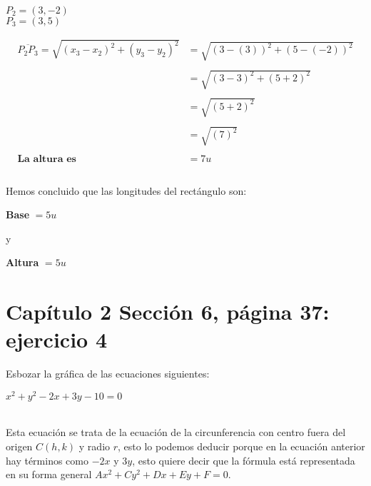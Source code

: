 \documentclass[12pt]{article}
\begin{document}
 $P_2 = (3,-2)$\\
 
 $P_3 = (3,5)$

\newpage

\begin{equation}
    \begin{split}
       \overline{P_2P_3}=\sqrt{(x_3-x_2)^{2}+(y_3-y_2)^2} & =  \sqrt{(3-(3))^{2}+(5-(-2))^2} \\\\
         & = \sqrt{(3-3)^{2}+(5+2)^2}\\\\ 
         & = \sqrt{(5+2)^{2}}\\\\ 
        & = \sqrt{(7)^{2}}\\\\ \textbf{La altura es} 
         & = 7u \\\\
    \end{split}
\end{equation}

Hemos concluido que las longitudes del rectángulo son:

\begin{center}
    \textbf{Base} $=5u$
\end{center}
\begin{center}
    y
\end{center}
\begin{center}
   \textbf{Altura} $=5u$
\end{center}

\section{Capítulo 2 Sección 6, página 37: ejercicio 4}

Esbozar la gráfica de las ecuaciones siguientes:

\begin{center}
    $x^{2}+y^{2}-2x+3y-10=0$
\end{center}

{}\\

Esta ecuación se trata de la ecuación de la circunferencia con centro fuera del origen $C(h,k)$ y radio $r$, esto lo podemos deducir porque en la ecuación anterior hay términos como $-2x$ y $3y$, esto quiere decir que la fórmula está representada en su forma general $Ax^2+Cy^2+Dx+Ey+F=0$. \\
\end{document}

